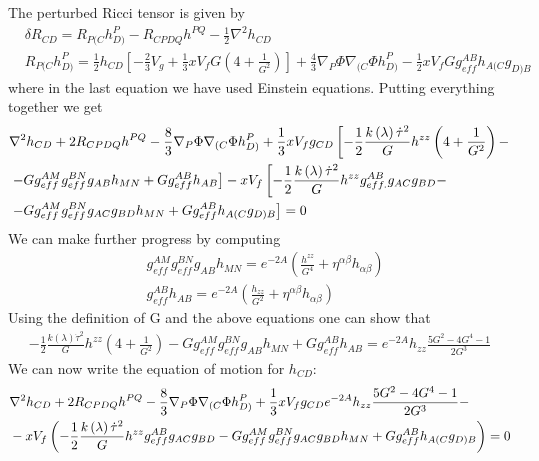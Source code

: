 \documentclass[a4paper,12pt]{article}
\begin{document}
The perturbed Ricci tensor is given by
\begin{align}
&\delta R_{CD} = R_{P(C}h_{D)}^P - R_{CPDQ}h^{PQ} - \frac{1}{2} \nabla^2 h_{CD} \\
&R_{P(C}h_{D)}^P = \frac{1}{2} h_{CD} \left[ - \frac{2}{3} V_g + \frac{1}{3} x V_f G \left( 4 + \frac{1}{G^2}\right) \right] + \frac{4}{3} \nabla_P \Phi \nabla_{(C}\Phi h_{D)}^P - \frac{1}{2} x V_f G g_{eff}^{AB} h_{A(C}g_{D)B}
\end{align}
where in the last equation we have used Einstein equations.
Putting everything together we get
\begin{align}
&\nabla^2 h_{CD} + 2 R_{CPDQ} h^{PQ} - \frac{8}{3} \nabla_P \Phi \nabla_{(C} \Phi h_{D)}^P + \frac{1}{3} x V_f g_{CD} \left[ - \frac{1}{2} \frac{k\left(\lambda\right) {\dot{\tau}}^2}{G} h^{zz} \left( 4 + \frac{1}{G^2} \right) - \right.  \notag \\
&\left. - G g_{eff}^{AM} g_{eff}^{BN} g_{AB} h_{MN} + G g_{eff}^{AB} h_{AB}  \right] - x V_f \left[ - \frac{1}{2} \frac{k\left(\lambda\right) {\dot{\tau}}^2}{G} h^{zz} g_{eff.}^{AB} g_{AC} g_{BD}  - \right. \notag \\
& \left. - G g_{eff}^{AM} g_{eff}^{BN} g_{AC} g_{BD} h_{MN} + G g_{eff}^{AB} h_{A(C} g_{D)B} \right] = 0
\end{align}
We can make further progress by computing
\begin{align}
&g_{eff}^{AM} g_{eff}^{BN} g_{AB} h_{MN}  = e^{-2A} \left( \frac{h^{zz}}{G^4} + \eta^{\alpha \beta} h_{\alpha \beta} \right) \\
&g_{eff}^{AB}h_{AB} = e^{-2A} \left( \frac{h_{zz}}{G^2} + \eta^{\alpha \beta} h_{\alpha \beta} \right)
\end{align}
Using the definition of G and the above equations one can show that
\begin{align}
- \frac{1}{2} \frac{k\left(\lambda\right) {\dot{\tau}}^2}{G} h^{zz} \left( 4 + \frac{1}{G^2} \right) - G g_{eff}^{AM} g_{eff}^{BN} g_{AB} h_{MN} + G g_{eff}^{AB} h_{AB} = e^{-2A} h_{zz} \frac{5 G^2 - 4 G^4 - 1}{2 G^3}
\end{align}
We can now write the equation of motion for $h_{CD}$:
\begin{align}
&\nabla^2 h_{CD} + 2 R_{CPDQ}h^{PQ} - \frac{8}{3} \nabla_P \Phi \nabla_{(C}\Phi h_{D)}^P + \frac{1}{3} x V_f g_{CD} e^{-2A} h_{zz} \frac{5 G^2 - 4 G^4 -1}{2G^3} - \notag \\
& - x V_f \left( - \frac{1}{2} \frac{k\left(\lambda\right) {\dot{\tau}}^2}{G} h^{zz} g_{eff}^{AB}g_{AC} g_{BD} - G g_{eff}^{AM} g_{eff}^{BN} g_{AC} g_{BD} h_{MN} + G g_{eff}^{AB} h_{A(C}g_{D)B} \right) = 0
\end{align}
\end{document}
